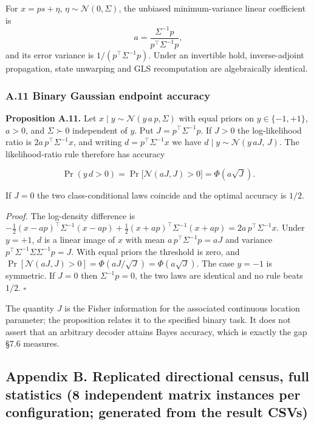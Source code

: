 \documentclass[
  10pt,
]{article}
\begin{document}
For \(x=p s+\eta\), \(\eta\sim\mathcal N(0,\Sigma)\), the unbiased
minimum-variance linear coefficient is \[
a=\frac{\Sigma^{-1}p}{p^\top\Sigma^{-1}p},
\] and its error variance is \(1/(p^\top\Sigma^{-1}p)\). Under an
invertible hold, inverse-adjoint propagation, state unwarping and GLS
recomputation are algebraically identical.

\subsubsection{A.11 Binary Gaussian endpoint
accuracy}\label{a.11-binary-gaussian-endpoint-accuracy}

\textbf{Proposition A.11.} Let \(x\mid y\sim\mathcal N(y\,a\,p,\Sigma)\)
with equal priors on \(y\in\{-1,+1\}\), \(a>0\), and \(\Sigma\succ0\)
independent of \(y\). Put \(J=p^\top\Sigma^{-1}p\). If \(J>0\) the
log-likelihood ratio is \(2a\,p^\top\Sigma^{-1}x\), and writing
\(d=p^\top\Sigma^{-1}x\) we have \(d\mid y\sim\mathcal N(y\,aJ,\,J)\).
The likelihood-ratio rule therefore has accuracy

\[
\Pr(y\,d>0)=\Pr\bigl[\mathcal N(aJ,J)>0\bigr]=\Phi\!\left(a\sqrt J\right).
\]

If \(J=0\) the two class-conditional laws coincide and the optimal
accuracy is \(1/2\).

\emph{Proof.} The log-density difference is
\(-\tfrac12(x-ap)^\top\Sigma^{-1}(x-ap)+\tfrac12(x+ap)^\top\Sigma^{-1}(x+ap)
=2a\,p^\top\Sigma^{-1}x\). Under \(y=+1\), \(d\) is a linear image of
\(x\) with mean \(a\,p^\top\Sigma^{-1}p=aJ\) and variance
\(p^\top\Sigma^{-1}\Sigma\Sigma^{-1}p=J\). With equal priors the
threshold is zero, and
\(\Pr[\mathcal N(aJ,J)>0]=\Phi(aJ/\sqrt J)=\Phi(a\sqrt J)\). The case
\(y=-1\) is symmetric. If \(J=0\) then \(\Sigma^{-1}p=0\), the two laws
are identical and no rule beats \(1/2\). \(\square\)

The quantity \(J\) is the Fisher information for the associated
continuous location parameter; the proposition relates it to the
specified binary task. It does not assert that an arbitrary decoder
attains Bayes accuracy, which is exactly the gap §7.6 measures.

\subsection{Appendix B. Replicated directional census, full statistics
(8 independent matrix instances per configuration; generated from the
result
CSVs)}\label{appendix-b.-replicated-directional-census-full-statistics-8-independent-matrix-instances-per-configuration-generated-from-the-result-csvs}
\end{document}
